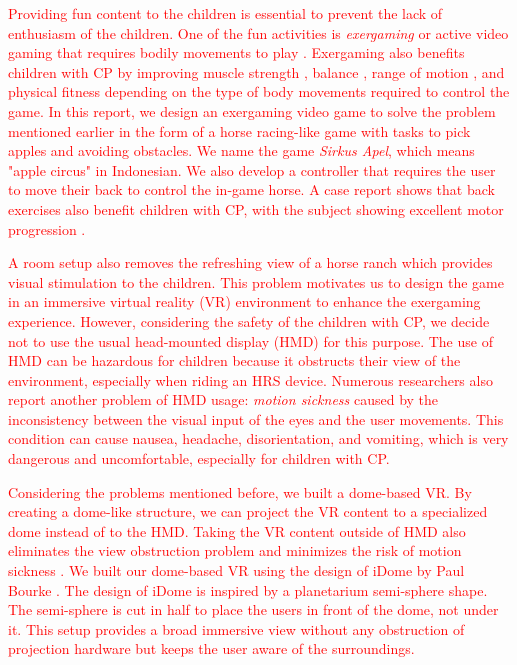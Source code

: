\textcolor{red}{Providing fun content to the children is essential to prevent the lack of enthusiasm of the children. One of the fun activities is \textit{exergaming} or active video gaming that requires bodily movements to play \cite{Benzing2018ExergamingThreats}. 
Exergaming also benefits children with CP by improving muscle strength \cite{Viana2021TheMeta-analysis}, balance \cite{Meyns2021ExergamingTrial}, range of motion \cite{Chen2007UseDesign}, and physical fitness \cite{Widman2006EffectivenessDysfunction} depending on the type of body movements required to control the game.
In this report, we design an exergaming video game to solve the problem mentioned earlier in the form of a horse racing-like game with tasks to pick apples and avoiding obstacles. We name the game \textit{Sirkus Apel}, which means "apple circus" in Indonesian. We also develop a controller that requires the user to move their back to control the in-game horse. A case report shows that back exercises also benefit children with CP, with the subject showing excellent motor progression \cite{Novak2016PromotingReport}.}

\textcolor{red}{A room setup also removes the refreshing view of a horse ranch which provides visual stimulation to the children. This problem motivates us to design the game in an immersive virtual reality (VR) environment to enhance the exergaming experience.
However, considering the safety of the children with CP, we decide not to use the usual head-mounted display (HMD) for this purpose. The use of HMD can be hazardous for children because it obstructs their view of the environment, especially when riding an HRS device.
Numerous researchers \cite{Farmani2018ViewpointReality,Weech2020SensoryCybersickness,Hemmerich2020VisuallyHorizon,Stauffert2020LatencyReview.,Palmisano2020CybersicknessPose} also report another problem of HMD usage: \textit{motion sickness} caused by the inconsistency between the visual input of the eyes and the user movements. This condition can cause nausea, headache, disorientation, and vomiting, which is very dangerous and uncomfortable, especially for children with CP.}

\textcolor{red}{Considering the problems mentioned before, we built a dome-based VR. By creating a dome-like structure, we can project the VR content to a specialized dome instead of to the HMD. Taking the VR content outside of HMD also eliminates the view obstruction problem and minimizes the risk of motion sickness \cite{Fauzi2017ImplementasiCAVE}. We built our dome-based VR using the design of iDome by Paul Bourke \cite{Bourke2009IDome:Engine}.
The design of iDome is inspired by a planetarium semi-sphere shape. The semi-sphere is cut in half to place the users in front of the dome, not under it. This setup provides a broad immersive view without any obstruction of projection hardware but keeps the user aware of the surroundings.}


